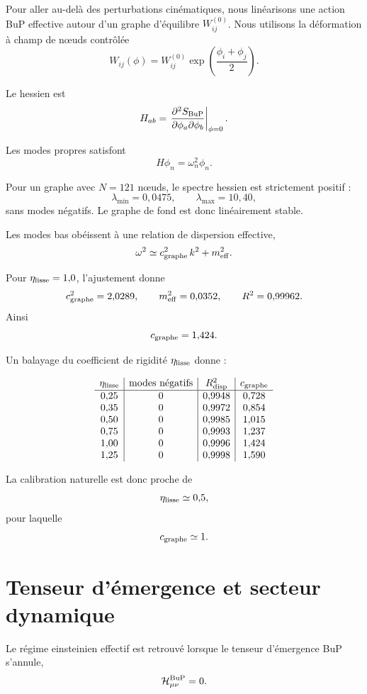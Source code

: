 \documentclass[11pt,a4paper]{article}
\begin{document}
Pour aller au-delà des perturbations cinématiques, nous linéarisons une action
BuP effective autour d'un graphe d'équilibre \(W_{ij}^{(0)}\). Nous utilisons la
déformation à champ de nœuds contrôlée
\[
W_{ij}(\phi) = W_{ij}^{(0)} \exp\left(\frac{\phi_i + \phi_j}{2}\right).
\]

Le hessien est
\[
H_{ab} = \left. \frac{\partial^2 S_{\rm BuP}}{\partial \phi_a \partial \phi_b} \right|_{\phi = 0}.
\]

Les modes propres satisfont
\[
H \phi_n = \omega_n^2 \phi_n.
\]

Pour un graphe avec \(N = 121\) nœuds, le spectre hessien est strictement positif :
\[
\lambda_{\min} = 0{,}0475,
\qquad
\lambda_{\max} = 10{,}40,
\]
sans modes négatifs. Le graphe de fond est donc linéairement stable.

Les modes bas obéissent à une relation de dispersion effective,
\[
\omega^2 \simeq c_{\rm graphe}^2 \, k^2 + m_{\rm eff}^2.
\]

Pour \(\eta_{\rm lisse} = 1{,}0\), l'ajustement donne
\[
c_{\rm graphe}^2 = 2{,}0289,
\qquad
m_{\rm eff}^2 = 0{,}0352,
\qquad
R^2 = 0{,}99962.
\]
Ainsi
\[
c_{\rm graphe} = 1{,}424.
\]

Un balayage du coefficient de rigidité \(\eta_{\rm lisse}\) donne :

\[
\begin{array}{c|c|c|c}
\eta_{\rm lisse} & \text{modes négatifs} & R^2_{\rm disp} & c_{\rm graphe} \\
\hline
0{,}25 & 0 & 0{,}9948 & 0{,}728 \\
0{,}35 & 0 & 0{,}9972 & 0{,}854 \\
0{,}50 & 0 & 0{,}9985 & 1{,}015 \\
0{,}75 & 0 & 0{,}9993 & 1{,}237 \\
1{,}00 & 0 & 0{,}9996 & 1{,}424 \\
1{,}25 & 0 & 0{,}9998 & 1{,}590 \\
\end{array}
\]

La calibration naturelle est donc proche de
\[
\eta_{\rm lisse} \simeq 0{,}5,
\]
pour laquelle
\[
c_{\rm graphe} \simeq 1.
\]

\section{Tenseur d'émergence et secteur dynamique}

Le régime einsteinien effectif est retrouvé lorsque le tenseur d'émergence BuP
s'annule,
\[
\mathcal H_{\mu\nu}^{\rm BuP} = 0.
\]
\end{document}
